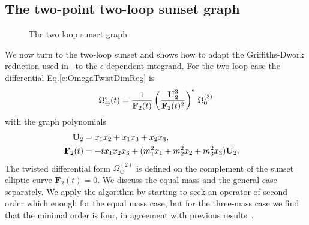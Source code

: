 \documentclass[a4paper,12pt]{article}
\numberwithin{equation}{section}
\numberwithin{figure}{section}
\def\su{\circleddash}
\begin{document}
\subsection{The two-point  two-loop sunset graph}
\label{sec:two-loop-case}

%
\begin{figure}[h]
  \centering
  \caption{The two-loop sunset graph}
  \label{fig:sunset2loop}
\end{figure}

We now turn to the two-loop sunset and shows how to adapt the
Griffiths-Dwork reduction used in~\cite{Bloch:2016izu,Lairez:2022zkj} to the $\epsilon$
dependent integrand. For the two-loop case the differential Eq.\eqref{e:OmegaTwistDimReg} is
\begin{equation}\label{e:OmegaSunset}
  \Omega_{\su}^{\epsilon}(t)={1\over
    \textbf{F}_2(t)}\left(\textbf{U}_2^3\over \textbf{F}_2(t)^2\right)^\epsilon  \,\Omega_0^{(3)}
\end{equation}
with the graph polynomials
\begin{align}
 \textbf{U}_2&=x_1x_2+x_1x_3+x_2x_3,\cr
  \textbf{F}_2(t)&=-tx_1x_2x_3 + (m_1^2x_1+m_2^2x_2+m_3^2x_3) \textbf{U}_2.
\end{align}
%
The twisted differential form $\Omega_\su^{(2)}$ is defined on the
complement of the sunset elliptic curve $\mathbf{F}_2(t)=0$.
%
We discuss the equal mass and the general case separately.
We apply the algorithm by starting to seek an operator of second order which enough for the equal mass case, but for the
three-mass case we find that the minimal order is four, in
agreement with previous results~\cite{Caffo:1998du,Remiddi:2013joa,Adams:2015gva}.
\end{document}
